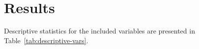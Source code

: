 \documentclass[10pt,letterpaper]{article}
\begin{document}
%

\section*{Results}\label{results}

Descriptive statistics for the included variables are presented in Table~\ref{tab:descriptive-vars}.
\end{document}
